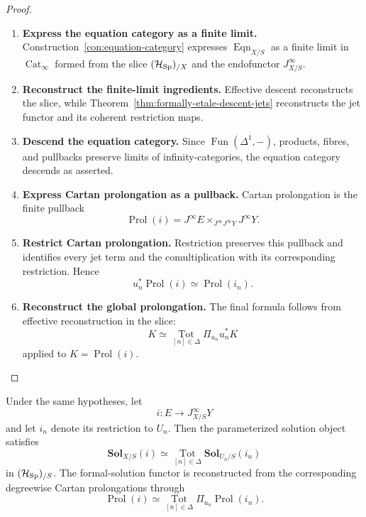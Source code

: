 \begin{proof}
\leavevmode
\begin{enumerate}[label=\textup{(\arabic*)}]
    \item \textbf{Express the equation category as a finite limit.}
Construction~\ref{con:equation-category} expresses
\(\operatorname{Eqn}_{X/S}\) as a finite limit in \(\operatorname{Cat}_\infty\)
formed from the slice \((\mathcal H_{\operatorname{Sp}})_{/X}\) and the endofunctor
\(J^\infty_{X/S}\).

    \item \textbf{Reconstruct the finite-limit ingredients.}
Effective descent reconstructs the slice, while
Theorem~\ref{thm:formally-etale-descent-jets} reconstructs the jet functor and
its coherent restriction maps.

    \item \textbf{Descend the equation category.}
Since
\(\operatorname{Fun}(\Delta^1,-)\), products, fibres, and pullbacks preserve
limits of infinity-categories, the equation category descends as asserted.

    \item \textbf{Express Cartan prolongation as a pullback.}
Cartan prolongation is the finite pullback
\[
  \operatorname{Prol}(i)
  =
  J^\infty E
  \times_{J^\infty J^\infty Y}
  J^\infty Y.
\]

    \item \textbf{Restrict Cartan prolongation.}
Restriction preserves this pullback and identifies every jet term and the
comultiplication with its corresponding restriction. Hence
\[
  u_n^*\operatorname{Prol}(i)
  \simeq
  \operatorname{Prol}(i_n).
\]

    \item \textbf{Reconstruct the global prolongation.}
The final formula follows from effective reconstruction in the slice:
\[
  K\simeq
  \operatorname*{Tot}_{[n]\in\Delta}\Pi_{u_n}u_n^*K
\]
applied to \(K=\operatorname{Prol}(i)\).
\end{enumerate}
\end{proof}

\begin{corollary}
\label{cor:formally-etale-solution-descent}
Under the same hypotheses, let
\[
  i:E\to J^\infty_{X/S}Y
\]
and let \(i_n\) denote its restriction to \(U_n\). Then the parameterized
solution object satisfies
\[
  \mathbf{Sol}_{X/S}(i)
  \simeq
  \operatorname*{Tot}_{[n]\in\Delta}
  \mathbf{Sol}_{U_n/S}(i_n)
\]
in \((\mathcal H_{\operatorname{Sp}})_{/S}\). The formal-solution functor is reconstructed
from the corresponding degreewise Cartan prolongations through
\[
  \operatorname{Prol}(i)
  \simeq
  \operatorname*{Tot}_{[n]\in\Delta}
  \Pi_{u_n}\operatorname{Prol}(i_n).
\]
\end{corollary}

